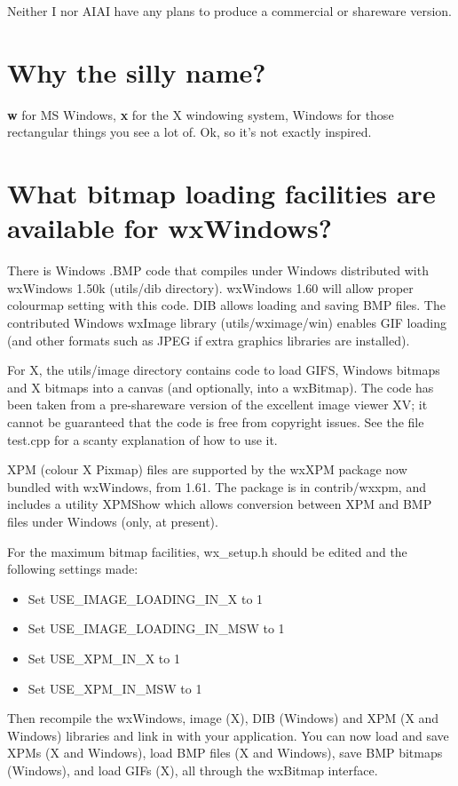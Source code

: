 Neither I nor AIAI have any plans to produce a commercial or shareware version.

\section{Why the silly name?}

{\bf w} for MS Windows, {\bf x} for the X windowing system, Windows for those rectangular
things you see a lot of. Ok, so it's not exactly inspired.

\section{What bitmap loading facilities are available for wxWindows?}

There is Windows .BMP code that compiles under Windows distributed with
wxWindows 1.50k (utils/dib directory). wxWindows 1.60 will allow proper
colourmap setting with this code. DIB allows loading and saving BMP
files. The contributed Windows wxImage library (utils/wximage/win)
enables GIF loading (and other formats such as JPEG if extra graphics
libraries are installed). 

For X, the utils/image directory contains code to load GIFS, Windows
bitmaps and X bitmaps into a canvas (and optionally, into a wxBitmap).
The code has been taken from a pre-shareware version of the excellent
image viewer XV; it cannot be guaranteed that the code is free from
copyright issues.  See the file test.cpp for a scanty explanation of how
to use it.

XPM (colour X Pixmap) files are supported by the wxXPM package
now bundled with wxWindows, from 1.61. The package is in contrib/wxxpm,
and includes a utility XPMShow which allows conversion between XPM
and BMP files under Windows (only, at present).

For the maximum bitmap facilities, wx\_setup.h should be edited
and the following settings made:

\begin{itemize}
\item Set USE\_IMAGE\_LOADING\_IN\_X to 1
\item Set USE\_IMAGE\_LOADING\_IN\_MSW to 1
\item Set USE\_XPM\_IN\_X to 1
\item Set USE\_XPM\_IN\_MSW to 1
\end{itemize}

Then recompile the wxWindows, image (X), DIB (Windows) and XPM (X and Windows)
libraries and link in with your application. You can now load and save
XPMs (X and Windows), load BMP files (X and Windows), save BMP
bitmaps (Windows), and load GIFs (X), all through the wxBitmap interface.

